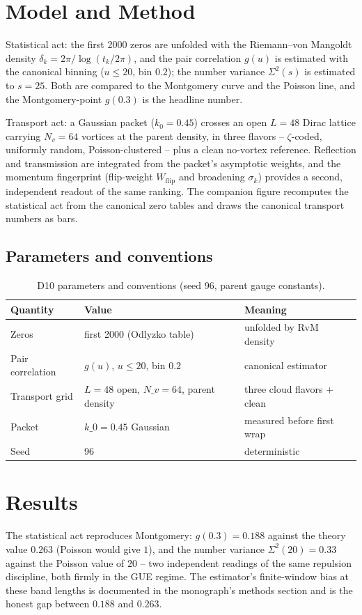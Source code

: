\documentclass[11pt,a4paper]{article}
\begin{document}
\section{Model and Method}
Statistical act: the first 2000 zeros are unfolded with the Riemann--von Mangoldt density $\delta_k = 2\pi/\log(t_k/2\pi)$, and the pair correlation $g(u)$ is estimated with the canonical binning ($u \le 20$, bin $0.2$); the number variance $\Sigma^2(s)$ is estimated to $s = 25$. Both are compared to the Montgomery curve and the Poisson line, and the Montgomery-point $g(0.3)$ is the headline number.

Transport act: a Gaussian packet ($k_0 = 0.45$) crosses an open $L = 48$ Dirac lattice carrying $N_v = 64$ vortices at the parent density, in three flavors -- $\zeta$-coded, uniformly random, Poisson-clustered -- plus a clean no-vortex reference. Reflection and transmission are integrated from the packet's asymptotic weights, and the momentum fingerprint (flip-weight $W_{\mathrm{flip}}$ and broadening $\sigma_k$) provides a second, independent readout of the same ranking. The companion figure recomputes the statistical act from the canonical zero tables and draws the canonical transport numbers as bars.

\subsection{Parameters and conventions}
\begin{table}[htbp]\centering\small
\begin{tabularx}{\columnwidth}{@{}l l X@{}}
\toprule
Quantity & Value & Meaning \\
\midrule
Zeros & first 2000 (Odlyzko table) & unfolded by RvM density \\
Pair correlation & $g(u)$, $u \le 20$, bin $0.2$ & canonical estimator \\
Transport grid & $L = 48$ open, $N\_v = 64$, parent density & three cloud flavors + clean \\
Packet & $k\_0 = 0.45$ Gaussian & measured before first wrap \\
Seed & 96 & deterministic \\
\bottomrule
\end{tabularx}
\caption{D10 parameters and conventions (seed 96, parent gauge constants).}
\end{table}

\section{Results}
The statistical act reproduces Montgomery: $g(0.3) = 0.188$ against the theory value $0.263$ (Poisson would give $1$), and the number variance $\Sigma^2(20) = 0.33$ against the Poisson value of $20$ -- two independent readings of the same repulsion discipline, both firmly in the GUE regime. The estimator's finite-window bias at these band lengths is documented in the monograph's methods section and is the honest gap between $0.188$ and $0.263$.
\end{document}
